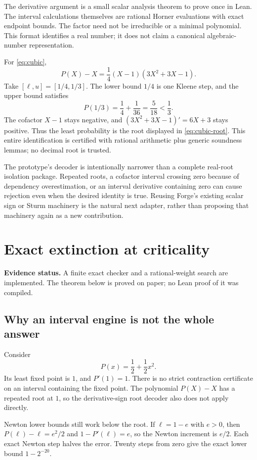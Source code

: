 \documentclass[11pt,a4paper]{article}
\theoremstyle{definition}\newtheorem{definition}[theorem]{Definition}
\theoremstyle{remark}\newtheorem{remark}[theorem]{Remark}
\newcommand{\status}[1]{\noindent\textbf{Evidence status.} #1\par}
\begin{document}
The derivative argument is a small scalar analysis theorem to prove once in Lean. The interval calculations themselves are rational Horner evaluations with exact endpoint bounds. The factor need not be irreducible or a minimal polynomial. This format identifies a real number; it does not claim a canonical algebraic-number representation.

For \eqref{eq:cubic},
\[
 P(X)-X=\frac14(X-1)(3X^2+3X-1).
\]
Take $[\ell,u]=[1/4,1/3]$. The lower bound $1/4$ is one Kleene step, and the upper bound satisfies
\[
 P(1/3)=\frac14+\frac1{36}=\frac5{18}<\frac13.
\]
The cofactor $X-1$ stays negative, and $(3X^2+3X-1)'=6X+3$ stays positive. Thus the least probability is the root displayed in \eqref{eq:cubic-root}. This entire identification is certified with rational arithmetic plus generic soundness lemmas; no decimal root is trusted.

The prototype's decoder is intentionally narrower than a complete real-root isolation package. Repeated roots, a cofactor interval crossing zero because of dependency overestimation, or an interval derivative containing zero can cause rejection even when the desired identity is true. Reusing Forge's existing scalar sign or Sturm machinery is the natural next adapter, rather than proposing that machinery again as a new contribution.



\section{Exact extinction at criticality}
\label{sec:critical}
\status{A finite exact checker and a rational-weight search are implemented. The theorem below is proved on paper; no Lean proof of it was compiled.}

\subsection{Why an interval engine is not the whole answer}
Consider
\begin{equation}
 \label{eq:critical}
 P(x)=\frac12+\frac12x^2.
\end{equation}
Its least fixed point is $1$, and $P'(1)=1$. There is no strict contraction certificate on an interval containing the fixed point. The polynomial $P(X)-X$ has a repeated root at $1$, so the derivative-sign root decoder also does not apply directly.

Newton lower bounds still work below the root. If $\ell=1-e$ with $e>0$, then $P(\ell)-\ell=e^2/2$ and $1-P'(\ell)=e$, so the Newton increment is $e/2$. Each exact Newton step halves the error. Twenty steps from zero give the exact lower bound $1-2^{-20}$.
\end{document}
